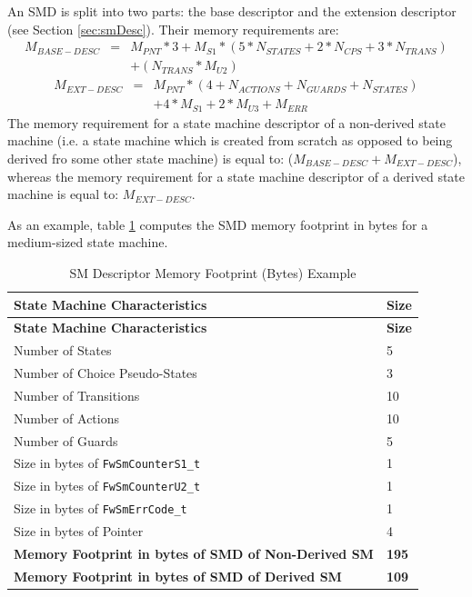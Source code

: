 \documentclass[manual]{../fwprofile}
\begin{document}
An SMD is split into two parts: the base descriptor and the extension descriptor (see Section \ref{sec:smDesc}). 
Their memory requirements are:
\begin{eqnarray*}
M_{BASE-DESC} & = & M_{PNT} * 3 + M_{S1} * (5 * N_{STATES} + 2 * N_{CPS} + 3 * N_{TRANS}) \\
              &   & + (N_{TRANS} * M_{U2}) 
\end{eqnarray*}
\begin{eqnarray*}
M_{EXT-DESC} & = & M_{PNT} * (4 + N_{ACTIONS} + N_{GUARDS} + N_{STATES}) \\
             &   & + 4 * M_{S1} + 2 * M_{U3} + M_{ERR}
\end{eqnarray*}
The memory requirement for a state machine descriptor of a non-derived state machine (i.e. a state machine which 
is created from scratch as opposed to being derived fro some other state machine) is equal to: 
($M_{BASE-DESC} + M_{EXT-DESC}$), whereas the memory requirement for a state machine descriptor of a derived state 
machine is equal to: $M_{EXT-DESC}$.

As an example, table \ref{tab:smdMemFootprintExample} computes the SMD memory footprint in bytes for a 
medium-sized state machine. 

\begin{longtable}{|p{10.0cm}|p{1.2cm}|}
\caption{SM Descriptor Memory Footprint (Bytes) Example} \label{tab:smdMemFootprintExample}\\
\hline
\rowcolor{gray}
\textbf{State Machine Characteristics} & \textbf{Size} \\
\hline\hline
\endfirsthead
\rowcolor{gray}
\textbf{State Machine Characteristics} & \textbf{Size} \\
\hline\hline
\endhead
Number of States & 5 \\
\hline
Number of Choice Pseudo-States & 3 \\
\hline
Number of Transitions & 10 \\
\hline
Number of Actions & 10 \\
\hline
Number of Guards & 5 \\
\hline
Size in bytes of \texttt{FwSmCounterS1\_t} & 1 \\
\hline
Size in bytes of \texttt{FwSmCounterU2\_t} & 1 \\
\hline
Size in bytes of \texttt{FwSmErrCode\_t} & 1 \\
\hline
Size in bytes of Pointer & 4 \\
\hline
\textbf{Memory Footprint in bytes of SMD of Non-Derived SM} & \textbf{195} \\
\hline
\textbf{Memory Footprint in bytes of SMD of Derived SM} & \textbf{109} \\
\hline
\end{longtable}
\end{document}
